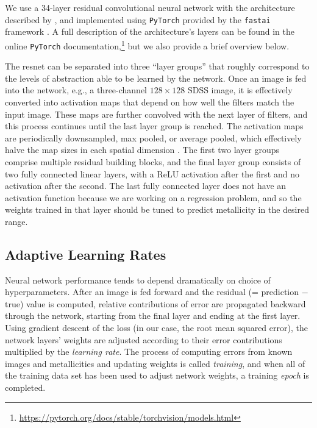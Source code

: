 \documentclass[fleqn,usenatbib]{mnras}
\begin{document}
We use a 34-layer residual convolutional neural network with the architecture described by \cite{He2015}, and implemented using \texttt{PyTorch} \citep[version 0.3.1;][]{pytorch} provided by the \texttt{fastai} framework \citep[version 0.7;][]{fastai}.
A full description of the architecture's layers can be found in the online \texttt{PyTorch} documentation,\footnote{\url{https://pytorch.org/docs/stable/torchvision/models.html}} but we also provide a brief overview below.

The resnet can be separated into three ``layer groups'' that roughly correspond to the levels of abstraction able to be learned by the network.
Once an image is fed into the network, e.g., a three-channel $128\times 128$ SDSS image, it is effectively converted into activation maps that depend on how well the filters match the input image.
These maps are further convolved with the next layer of filters, and this process continues until the last layer group is reached.
The activation maps are periodically downsampled, max pooled, or average pooled, which effectively halve the map sizes in each spatial dimension \citep[for more about pooling layers in CNNs, see][]{Scherer2010}.
The first two layer groups comprise multiple residual building blocks, and the final layer group consists of two fully connected linear layers, with a ReLU activation after the first and no activation after the second.
The last fully connected layer does not have an activation function because we are working on a regression problem, and so the weights trained in that layer should be tuned to predict metallicity in the desired range.



\subsection{Adaptive Learning Rates}

Neural network performance tends to depend dramatically on choice of hyperparameters.
After an image is fed forward and the residual (= prediction $-$ true) value is computed, relative contributions of error are propagated backward through the network, starting from the final layer and ending at the first layer.
Using gradient descent of the loss (in our case, the root mean squared error), the network layers' weights are adjusted according to their error contributions multiplied by the \textit{learning rate}.
The process of computing errors from known images and metallicities and updating weights is called \textit{training}, and when all of the training data set has been used to adjust network weights, a training \textit{epoch} is completed.
\end{document}
